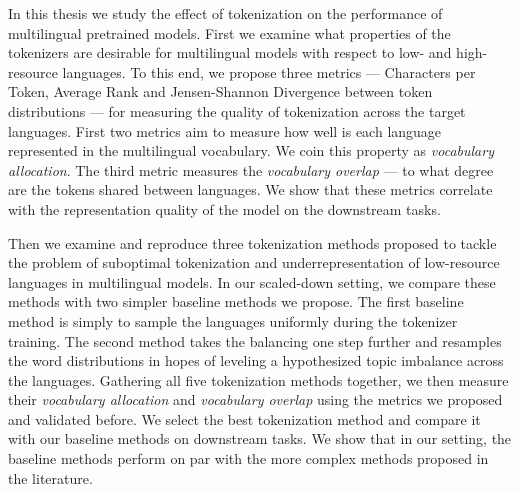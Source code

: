 

In this thesis we study the effect of tokenization on the performance of multilingual pretrained models.  First we examine what properties of the tokenizers are desirable for multilingual models with respect to low- and high- resource languages. To this end, we propose three metrics --- Characters per Token, Average Rank and Jensen-Shannon Divergence between token distributions --- for measuring the quality of tokenization across the target languages. First two metrics aim to measure how well is each language represented in the multilingual vocabulary. We coin this property as \textit{vocabulary allocation}. The third metric measures the \textit{vocabulary overlap} --- to what degree are the tokens shared between languages. We show that these metrics correlate with the representation quality of the model on the downstream tasks. 

Then we examine and reproduce three tokenization methods \citep{chung_improving_2020,zheng_allocating_2021,liang_xlm-v_2023} proposed to tackle the problem of suboptimal tokenization and underrepresentation of low-resource languages in multilingual models.  In our scaled-down setting, we compare these methods with two simpler baseline methods we propose. The first baseline method  is simply to sample the languages uniformly during the tokenizer training. The second method  takes the balancing one step further and resamples the word distributions in hopes of leveling a hypothesized topic imbalance across the languages. 
Gathering all five tokenization methods together, we then measure their \textit{vocabulary allocation} and \textit{vocabulary overlap} using the metrics we proposed and validated before. We select the best tokenization method and compare it with our baseline methods on downstream tasks. We show that in our setting, the baseline methods perform on par with the more complex methods proposed in the literature. 

